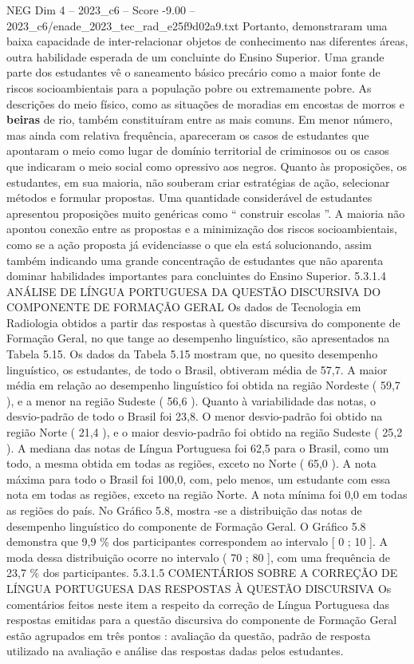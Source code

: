 \begin{textsample}{NEG Dim 4 – 2023\_c6 – Score -9.00 – 2023\_c6/enade\_2023\_tec\_rad\_e25f9d02a9.txt}
Portanto, demonstraram uma baixa capacidade de inter-relacionar objetos de conhecimento nas diferentes áreas, outra habilidade esperada de um concluinte do Ensino Superior.
Uma grande parte dos estudantes vê o saneamento básico precário como a maior fonte de riscos socioambientais para a população pobre ou extremamente pobre.
As descrições do meio físico, como as situações de moradias em encostas de morros e \textbf{beiras} de rio, também constituíram entre as mais comuns.
Em menor número, mas ainda com relativa frequência, apareceram os casos de estudantes que apontaram o meio como lugar de domínio territorial de criminosos ou os casos que indicaram o meio social como opressivo aos negros.
Quanto às proposições, os estudantes, em sua maioria, não souberam criar estratégias de ação, selecionar métodos e formular propostas.
Uma quantidade considerável de estudantes apresentou proposições muito genéricas como “ construir escolas ”.
A maioria não apontou conexão entre as propostas e a minimização dos riscos socioambientais, como se a ação proposta já evidenciasse o que ela está solucionando, assim também indicando uma grande concentração de estudantes que não aparenta dominar habilidades importantes para concluintes do Ensino Superior. 5.3.1.4 ANÁLISE DE LÍNGUA PORTUGUESA DA QUESTÃO DISCURSIVA DO COMPONENTE DE FORMAÇÃO GERAL Os dados de Tecnologia em Radiologia obtidos a partir das respostas à questão discursiva do componente de Formação Geral, no que tange ao desempenho linguístico, são apresentados na Tabela 5.15.
Os dados da Tabela 5.15 mostram que, no quesito desempenho linguístico, os estudantes, de todo o Brasil, obtiveram média de 57,7.
A maior média em relação ao desempenho linguístico foi obtida na região Nordeste ( 59,7 ), e a menor na região Sudeste ( 56,6 ).
Quanto à variabilidade das notas, o desvio-padrão de todo o Brasil foi 23,8.
O menor desvio-padrão foi obtido na região Norte ( 21,4 ), e o maior desvio-padrão foi obtido na região Sudeste ( 25,2 ).
A mediana das notas de Língua Portuguesa foi 62,5 para o Brasil, como um todo, a mesma obtida em todas as regiões, exceto no Norte ( 65,0 ).
A nota máxima para todo o Brasil foi 100,0, com, pelo menos, um estudante com essa nota em todas as regiões, exceto na região Norte.
A nota mínima foi 0,0 em todas as regiões do país.
No Gráfico 5.8, mostra -se a distribuição das notas de desempenho linguístico do componente de Formação Geral.
O Gráfico 5.8 demonstra que 9,9 \% dos participantes correspondem ao intervalo [ 0 ; 10 ].
A moda dessa distribuição ocorre no intervalo ( 70 ; 80 ], com uma frequência de 23,7 \% dos participantes. 5.3.1.5 COMENTÁRIOS SOBRE A CORREÇÃO DE LÍNGUA PORTUGUESA DAS RESPOSTAS À QUESTÃO DISCURSIVA Os comentários feitos neste item a respeito da correção de Língua Portuguesa das respostas emitidas para a questão discursiva do componente de Formação Geral estão agrupados em três pontos : avaliação da questão, padrão de resposta utilizado na avaliação e análise das respostas dadas pelos estudantes.

\end{textsample}
